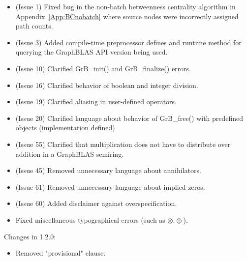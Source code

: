 \begin{itemize}
\item (Issue 1) Fixed bug in the non-batch betweenness centrality algorithm in 
Appendix~\ref{App:BCnobatch} where source nodes were incorrectly assigned path counts.
\item (Issue 3) Added compile-time preprocessor defines and runtime method for querying the GraphBLAS API version being used.
\item (Issue 10) Clarified {\sf GrB\_init()} and {\sf GrB\_finalize()} errors.
\item (Issue 16) Clarified behavior of boolean and integer division.
\item (Issue 19) Clarified aliasing in user-defined operators.
\item (Issue 20) Clarified language about behavior of {\sf GrB\_free()} with predefined objects (implementation defined)
\item (Issue 55) Clarified that multiplication does not have to distribute over addition in a GraphBLAS semiring.
\item (Issue 45) Removed unnecessary language about annihilators.
\item (Issue 61) Removed unnecessary language about implied zeros.
\item (Issue 60) Added disclaimer against overspecification.
\item Fixed miscellaneous typographical errors (such as $\otimes.\oplus$).
\end{itemize}


Changes in 1.2.0:
\begin{itemize}
\item Removed "provisional" clause.
\end{itemize}


